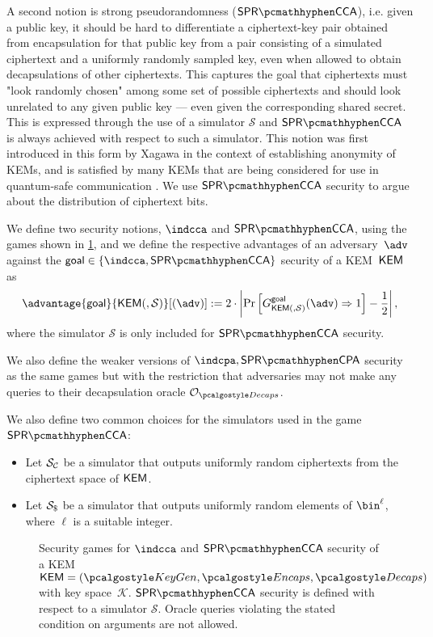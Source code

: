A second notion is strong pseudorandomness ($\sprcca$), i.e. given a public key, it should be hard to differentiate a ciphertext-key pair obtained from encapsulation for that public key from a pair consisting of a simulated ciphertext and a uniformly randomly sampled key, even when allowed to obtain decapsulations of other ciphertexts.
This captures the goal that ciphertexts must "look randomly chosen" among some set of possible ciphertexts and should look unrelated to any given public key --- even given the corresponding shared secret.
This is expressed through the use of a simulator $\mathcal S$ and $\sprcca$ is always achieved with respect to such a simulator.
This notion was first introduced in this form by Xagawa \cite{EC:Xagawa22} in the context of establishing anonymity of KEMs, and is satisfied by many KEMs that are being considered for use in quantum-safe communication \cite{EC:Xagawa22}. We use $\sprcca$ security to argue about the distribution of ciphertext bits.

\begin{definition} \label{def:kem-security}
    We define two security notions, $\indcca$ and $\sprcca$, using the games shown in \cref{fig:kem-security}, and we define the respective advantages of an adversary~$\adv$ against the $\mathsf{goal} \in \{\indcca, \sprcca\}$ security of a KEM~$\mathsf{KEM}$ as
    \[
        \advantage{\mathsf{goal}}{\KEM(, \mathcal{S})}[(\adv)] := 2 \cdot \left| \Pr \left[ G^{\mathsf{goal}}_{\KEM(, \mathcal{S})}(\adv) \Rightarrow 1 \right] - \frac{1}{2} \right|,
    \]
    where the simulator $\mathcal{S}$ is only included for $\sprcca$ security.

    We also define the weaker versions of $\indcpa,\sprcpa$ security as the same games but with the restriction that adversaries may not make any queries to their decapsulation oracle $\decapsoracle$.

    We also define two common choices for the simulators used in the game $\sprcca$: \begin{itemize}
        \item Let $\mathcal{S}_\mathcal{C}$ be a simulator that outputs uniformly random ciphertexts from the ciphertext space of $\mathsf{KEM}$.
        \item Let $\simulbin$ be a simulator that outputs uniformly random elements of $\bin^\ell$, where $\ell$ is a suitable integer.
    \end{itemize}
\end{definition}

\begin{figure}
    
    \caption[
        Security games for $\indcca$ and $\sprcca$ security of a KEM or obfuscated KEM.
    ]{
        Security games for $\indcca$ and $\sprcca$ security of a KEM~$\KEM = (\kgen, \encaps, \decaps)$ with key space~$\mathcal K$. $\sprcca$ security is defined with respect to a simulator $\mathcal S$. Oracle queries violating the stated condition on arguments are not allowed.
    }
    \label{fig:kem-security}
\end{figure}

